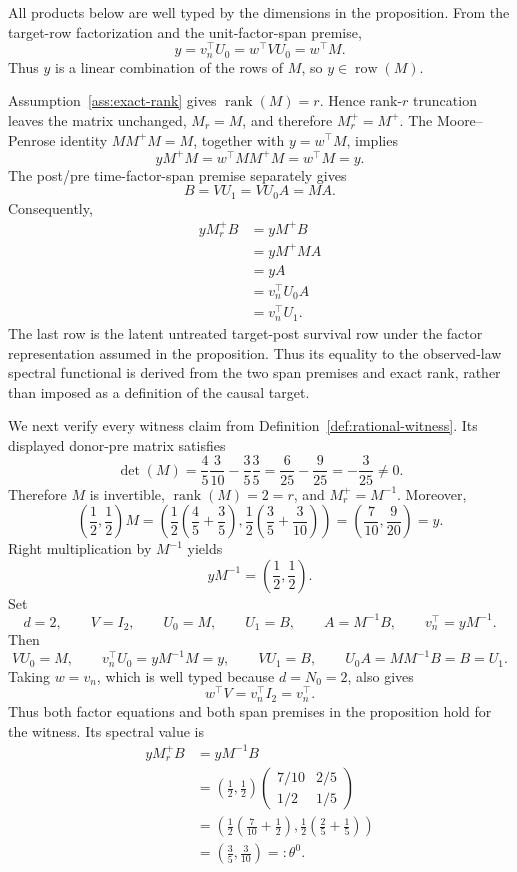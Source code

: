 All products below are well typed by the dimensions in the proposition.  From the target-row factorization and the unit-factor-span premise,
\[
y=v_n^\top U_0=w^\top VU_0=w^\top M.
\]
Thus \(y\) is a linear combination of the rows of \(M\), so \(y\in\operatorname{row}(M)\).

Assumption~\ref{ass:exact-rank} gives \(\operatorname{rank}(M)=r\).  Hence rank-\(r\) truncation leaves the matrix unchanged, \(M_r=M\), and therefore \(M_r^+=M^+\).  The Moore--Penrose identity \(MM^+M=M\), together with \(y=w^\top M\), implies
\[
yM^+M=w^\top MM^+M=w^\top M=y.
\]
The post/pre time-factor-span premise separately gives
\[
B=VU_1=VU_0A=MA.
\]
Consequently,
\[
\begin{aligned}
yM_r^+B
&=yM^+B\\
&=yM^+MA\\
&=yA\\
&=v_n^\top U_0A\\
&=v_n^\top U_1.
\end{aligned}
\]
The last row is the latent untreated target-post survival row under the factor representation assumed in the proposition.  Thus its equality to the observed-law spectral functional is derived from the two span premises and exact rank, rather than imposed as a definition of the causal target.

We next verify every witness claim from Definition~\ref{def:rational-witness}.  Its displayed donor-pre matrix satisfies
\[
\det(M)=\frac45\frac3{10}-\frac35\frac35
=\frac6{25}-\frac9{25}
=-\frac3{25}\ne0.
\]
Therefore \(M\) is invertible, \(\operatorname{rank}(M)=2=r\), and \(M_r^+=M^{-1}\).  Moreover,
\[
\left(\frac12,\frac12\right)M
=\left(
\frac12\left(\frac45+\frac35\right),
\frac12\left(\frac35+\frac3{10}\right)
\right)
=\left(\frac7{10},\frac9{20}\right)
=y.
\]
Right multiplication by \(M^{-1}\) yields
\[
yM^{-1}=\left(\frac12,\frac12\right).
\]
Set
\[
d=2,\qquad V=I_2,\qquad U_0=M,\qquad U_1=B,
\qquad A=M^{-1}B,\qquad v_n^\top=yM^{-1}.
\]
Then
\[
VU_0=M,\qquad v_n^\top U_0=yM^{-1}M=y,
\qquad VU_1=B,\qquad U_0A=MM^{-1}B=B=U_1.
\]
Taking \(w=v_n\), which is well typed because \(d=N_0=2\), also gives
\[
w^\top V=v_n^\top I_2=v_n^\top.
\]
Thus both factor equations and both span premises in the proposition hold for the witness.  Its spectral value is
\[
\begin{aligned}
yM_r^+B
&=yM^{-1}B\\
&=\left(\frac12,\frac12\right)
\begin{pmatrix}7/10&2/5\\1/2&1/5\end{pmatrix}\\
&=\left(
\frac12\left(\frac7{10}+\frac12\right),
\frac12\left(\frac25+\frac15\right)
\right)\\
&=\left(\frac35,\frac3{10}\right)=:\theta^0.
\end{aligned}
\]

